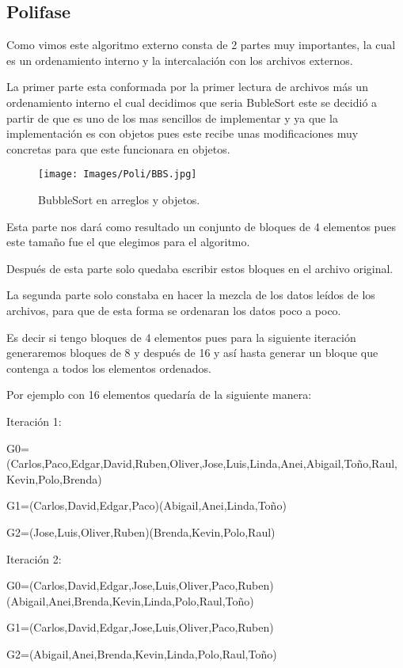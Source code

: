 \documentclass[letter]{report}
\begin{document}
\subsection*{Polifase}
Como vimos este algoritmo externo consta de 2 partes muy importantes, la cual es un ordenamiento interno y la intercalación con los archivos externos.

La primer parte esta conformada por la primer lectura de archivos más un ordenamiento interno el cual decidimos que seria BubleSort este se decidió a partir de que es uno de los mas sencillos de implementar y ya que la implementación es con objetos pues este recibe unas  modificaciones muy concretas  para que este funcionara en objetos.

\begin{figure}[h!]
    \centering
    \texttt{[image: Images/Poli/BBS.jpg]}
    \caption{BubbleSort en arreglos y objetos.}
\end{figure}

Esta parte nos dará como resultado un conjunto de bloques de 4 elementos pues este tamaño fue el que elegimos para el algoritmo.

Después de esta parte solo quedaba escribir estos bloques en el archivo original.\medskip\medskip

La segunda parte solo constaba en hacer la mezcla de los datos leídos de los archivos, para que de esta forma se ordenaran los datos poco a poco.

Es decir si tengo bloques de 4 elementos pues para la siguiente iteración generaremos bloques de 8 y después de 16 y así hasta generar un bloque que contenga a todos los elementos ordenados.

Por ejemplo con 16 elementos quedaría de la siguiente manera:\medskip

Iteración 1:

G0=(Carlos,Paco,Edgar,David,Ruben,Oliver,Jose,Luis,Linda,Anei,Abigail,Toño,Raul,Kevin,Polo,Brenda)

G1=(Carlos,David,Edgar,Paco)(Abigail,Anei,Linda,Toño)

G2=(Jose,Luis,Oliver,Ruben)(Brenda,Kevin,Polo,Raul)\medskip

Iteración 2:  

G0=(Carlos,David,Edgar,Jose,Luis,Oliver,Paco,Ruben)(Abigail,Anei,Brenda,Kevin,Linda,Polo,Raul,Toño)

G1=(Carlos,David,Edgar,Jose,Luis,Oliver,Paco,Ruben)

G2=(Abigail,Anei,Brenda,Kevin,Linda,Polo,Raul,Toño)\medskip
\end{document}
